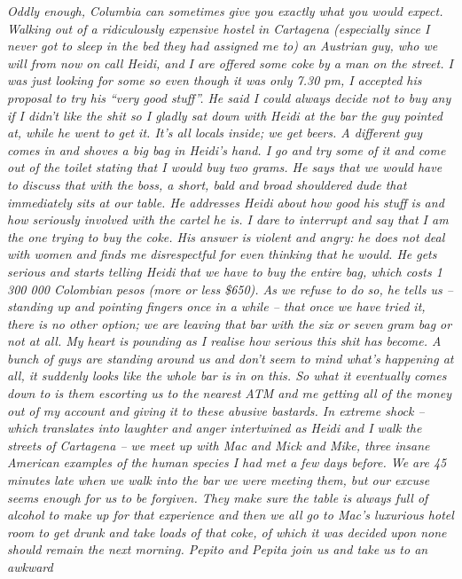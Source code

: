 \textit{Oddly enough, Columbia can sometimes give you exactly what you
	would expect. 
	Walking out of a ridiculously expensive hostel in Cartagena
	(especially since I never got to sleep in the bed they had
	assigned me to) an Austrian guy, who we will from now on call
	Heidi, and I are offered some coke by a man on the street. I
	was just looking for some so even though it was only 7.30 pm,
	I accepted his proposal to try his “very good stuff”. He said
	I could always decide not to buy any if I didn’t like the shit
	so I gladly sat down with Heidi at the bar the guy pointed at,
	while he went to get it. It’s all locals inside; we get beers.
	A different guy comes in and shoves a big bag in Heidi’s hand.
	I go and try some of it and come out of the toilet stating
	that I would buy two grams. He says that we would have to
	discuss that with the boss, a short, bald and broad shouldered
	dude that immediately sits at our table. He addresses Heidi
	about how good his stuff is and how seriously involved with
	the cartel he is. I dare to interrupt and say that I am the
	one trying to buy the coke. His answer is violent and angry:
	he does not deal with women and finds me disrespectful for
	even thinking that he would. He gets serious and starts
	telling Heidi that we have to buy the entire bag, which costs
	1 300 000 Colombian pesos (more or less \$650). As we refuse to
	do so, he tells us – standing up and pointing fingers once in
	a while – that once we have tried it, there is no other
	option; we are leaving that bar with the six or seven gram bag
	or not at all. My heart is pounding as I realise how serious
	this shit has become. 
	A bunch of guys are standing around us and don’t seem to mind
	what’s happening at all, it suddenly looks like the whole bar
	is in on this. So what it eventually comes down to is them
	escorting us to the nearest ATM and me getting all of the
	money out of my account and giving it to these abusive
	bastards. In extreme shock – which translates into laughter
	and anger intertwined as Heidi and I walk the streets of
	Cartagena – we meet up with Mac and Mick and Mike, three
	insane American examples of the human species I had met a few
	days before. We are 45 minutes late when we walk into the bar
	we were meeting them, but our excuse seems enough for us to be
	forgiven. They make sure the table is always full of alcohol
	to make up for that experience and then we all go to Mac’s
	luxurious hotel room to get drunk and take loads of that coke,
	of which it was decided upon none should remain the next
	morning. Pepito and Pepita join us and take us to an awkward
}
